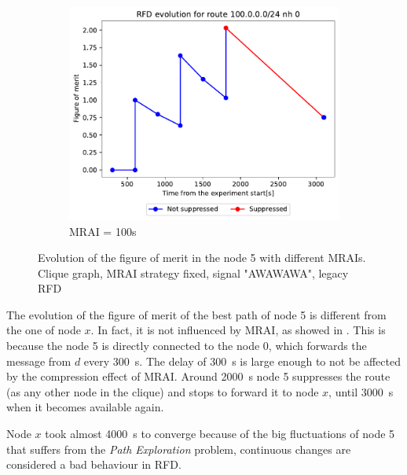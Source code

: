 \begin{figure}[h]
\begin{subfigure}[b]{0.49\textwidth}
         \label{fig:clique_5_mrai50}
     \end{subfigure}
     \hfill
     \begin{subfigure}[b]{0.49\textwidth}
         \centering
         \includegraphics[width=\textwidth]{images/RFD/clique/FigureOfMerit/mrai21_RFD_5_rfd_R1.pdf}
         \caption{MRAI = 100s}
         \label{fig:clique_5_mrai100}
     \end{subfigure}
		\caption{Evolution of the figure of merit in the node \num{5} with different MRAIs.
		Clique graph, MRAI strategy fixed, signal "AWAWAWA", legacy RFD}
        \label{fig:clique_node5}
\end{figure}

The evolution of the figure of merit of the best path of node \num{5} is different
from the one of node $x$.
In fact, it is not influenced by \ac{MRAI}, as showed in .
This is because the node \num{5} is directly connected to the node \num{0}, which
forwards the message from $d$ every \SI{300}{\second}.
The delay of \SI{300}{\second} is large enough to not be affected by the
compression effect of \ac{MRAI}.
Around \SI{2000}{\second} node \num{5} suppresses the route (as any other node in the
clique) and stops to forward it to node $x$, until \SI{3000}{\second} when it becomes
available again.

Node $x$ took almost \SI{4000}{\second} to converge because of the big fluctuations
of node \num{5} that suffers from the \textit{Path Exploration} problem, continuous
changes are considered a bad behaviour in \ac{RFD}.

